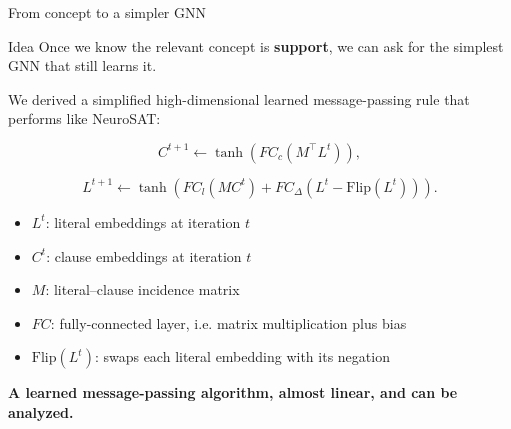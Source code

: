 \documentclass[aspectratio=169,10pt,dvipsnames]{beamer}
\begin{document}
\begin{frame}{From concept to a simpler GNN}

\small

\begin{block}{Idea}
Once we know the relevant concept is \textbf{support}, we can ask for the
simplest GNN that still learns it.
\end{block}

\vspace{0.5em}

We derived a simplified high-dimensional learned message-passing rule that performs like NeuroSAT:

\[
C^{t+1}
\longleftarrow
\tanh\!\left(FC_c\!\left(M^\top L^t\right)\right),
\]

\[
L^{t+1}
\longleftarrow
\tanh\!\left(
FC_l\!\left(M C^t\right)
+
FC_{\Delta}\!\left(L^t - \mathrm{Flip}(L^t)\right)
\right).
\]

\vspace{0.6em}

\begin{itemize}
    \item \(L^t\): literal embeddings at iteration \(t\)
    \item \(C^t\): clause embeddings at iteration \(t\)
    \item \(M\): literal--clause incidence matrix
    \item \(FC\): fully-connected layer, i.e. matrix multiplication plus bias
    \item \(\mathrm{Flip}(L^t)\): swaps each literal embedding with its negation
\end{itemize}

\vspace{0.4em}

\begin{center}
\textcolor{blue!70!black}{
\textbf{A learned message-passing algorithm, almost linear, and can be analyzed.}
}
\end{center}

\end{frame}
\end{document}
